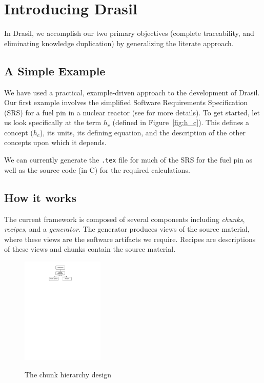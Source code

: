 \documentclass{sig-alternate-05-2015}
\newcommand{\lss}{Drasil}
\begin{document}
\section{Introducing \lss} \label{sec:lss}

In \lss, we accomplish our two primary objectives (complete traceability, and
eliminating knowledge duplication) by generalizing the literate approach.

\subsection{A Simple Example} \label{ssec:example}

We have used a practical, example-driven approach to the development of \lss{}.
Our first example involves 
the simplified Software Requirements Specification (SRS) for a fuel pin in a
nuclear reactor (see \cite{SmithAndKoothoor2016} for more details). To get
started, let us look specifically at the term $h_c$ (defined in
Figure~\ref{fig:h_c}).  This defines a concept ($h_c$), its units, its
defining equation, and the description of the other concepts upon which it
depends.

We can currently generate the \verb|.tex| file for
much of the SRS for the fuel pin as well as the source code (in C) for the
required calculations.

\subsection{How it works} \label{sssec:ex_how}

The current framework is composed of several components including
\textit{chunks}, \textit{recipes}, and a \textit{generator}. The generator
produces views of the source material, where these views are the software
artifacts we require. Recipes are descriptions of these views and chunks contain
the source material.


\begin{figure}
\begin{center}
{
 \includegraphics[width=0.35\textwidth]{ChunkHierarchy.pdf}
}
\end{center}
\caption{The chunk hierarchy design}
\label{fig:chunks}
\end{figure}
\end{document}
